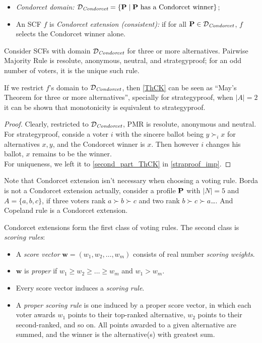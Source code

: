 \begin{definition}
    \begin{itemize}
        \item \textit{Condorcet domain:} $\mathcal{D}_\textit{Condorcet} = \{\mathbf{P}\;|\; \mathbf{P} \mbox{ has a Condorcet winner}\}$;
        \item An SCF $f$ is \textit{Condorcet extension (consistent):} if for all $\mathbf{P} \in \mathcal{D}_\textit{Condorcet}$, $f$ selects the Condorcet winner alone.
    \end{itemize}
\end{definition}

\begin{theorem}
    \label{ThCK}
    Consider SCFs with domain $\mathcal{D}_\textit{Condorcet}$ for three or more alternatives. Pairwise Majority Rule is resolute, anonymous, neutral, and strategyproof; for an odd number of voters, it is the unique such rule.
\end{theorem}

If we restrict $f$'s domain to $\mathcal{D}_\textit{Condorcet}$, then \cref{ThCK} can be seen as “May's Theorem for three or more alternatives”, specially for strategyproof, when $|A| = 2$ it can be shown that monotonicity is equivalent to strategyproof.

\begin{proof}
    Clearly, restricted to $\mathcal{D}_\textit{Condorcet}$, PMR is resolute, anonymous and neutral. For strategyproof, conside a voter $i$ with the sincere ballot being $y \succ_i x$ for alternatives $x,y$, and the Condorcet winner is $x$. Then however $i$ changes his ballot, $x$ remains to be the winner.\\
    For uniqueness, we left it to \cref{second_part_ThCK} in \cref{straproof_imp}.
\end{proof}

Note that Condorcet extension isn't necessary when choosing a voting rule. Borda is not a Condorcet extension actually, consider a profile $\mathbf{P}$ with $|N| = 5$ and $A = \{a,b,c\}$, if three voters rank $a \succ b \succ c$ and two rank $b \succ c \succ a$\dots. And Copeland rule is a Condorcet extension.

Condorcet extensions form the first class of voting rules. The second class is \textit{scoring rules}:

\begin{definition}
    \label{scoring_rule}
    \begin{itemize}
        \item A \textit{score vector} $\mathbf{w} = (w_1,w_2,\dots,w_m)$ consists of real number \textit{scoring weights}. 
        \item $\mathbf{w}$ is \textit{proper} if $w_1 \geq w_2 \geq \dots \geq w_m$ and $w_1 > w_m$.
        \item Every score vector induces a \emph{scoring rule}.
        \item A \textit{proper scoring rule} is one induced by a proper score vector, in which each voter awards $w_1$ points to their top-ranked alternative, $w_2$ points to their second-ranked, and so on. All points awarded to a given alternative are summed, and the winner is the alternative(s) with greatest sum.
    \end{itemize}
\end{definition}

